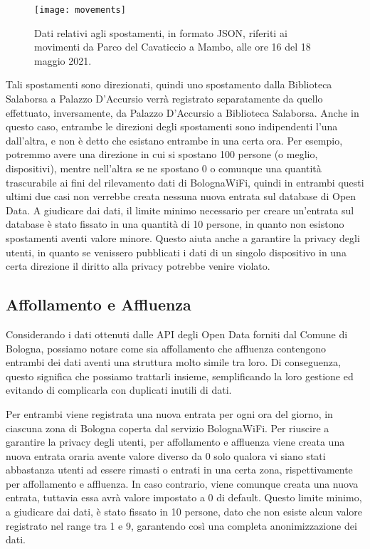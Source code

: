 \begin{figure}[H]
    \centering
    \texttt{[image: movements]}
    \caption[Struttura dei dati sugli spostamenti]{Dati relativi agli spostamenti, in formato JSON, riferiti ai movimenti da Parco del Cavaticcio a Mambo, alle ore 16 del 18 maggio 2021.}
    \label{fig:movements}
\end{figure}

Tali spostamenti sono direzionati, quindi uno spostamento dalla Biblioteca Salaborsa a Palazzo D'Accursio verrà registrato separatamente da quello effettuato, inversamente, da Palazzo D'Accursio a Biblioteca Salaborsa. Anche in questo caso, entrambe le direzioni degli spostamenti sono indipendenti l'una dall'altra, e non è detto che esistano entrambe in una certa ora. Per esempio, potremmo avere una direzione in cui si spostano 100 persone (o meglio, dispositivi), mentre nell'altra se ne spostano 0 o comunque una quantità trascurabile ai fini del rilevamento dati di BolognaWiFi, quindi in entrambi questi ultimi due casi non verrebbe creata nessuna nuova entrata sul database di Open Data. A giudicare dai dati, il limite minimo necessario per creare un'entrata sul database è stato fissato in una quantità di 10 persone, in quanto non esistono spostamenti aventi valore minore. Questo aiuta anche a garantire la privacy degli utenti, in quanto se venissero pubblicati i dati di un singolo dispositivo in una certa direzione il diritto alla privacy potrebbe venire violato.

\subsection{Affollamento e Affluenza}
Considerando i dati ottenuti dalle API degli Open Data forniti dal Comune di Bologna, possiamo notare come sia affollamento che affluenza contengono entrambi dei dati aventi una struttura molto simile tra loro. Di conseguenza, questo significa che possiamo trattarli insieme, semplificando la loro gestione ed evitando di complicarla con duplicati inutili di dati.

Per entrambi viene registrata una nuova entrata per ogni ora del giorno, in ciascuna zona di Bologna coperta dal servizio BolognaWiFi. Per riuscire a garantire la privacy degli utenti, per affollamento e affluenza viene creata una nuova entrata oraria avente valore diverso da 0 solo qualora vi siano stati abbastanza utenti ad essere rimasti o entrati in una certa zona, rispettivamente per affollamento e affluenza. In caso contrario, viene comunque creata una nuova entrata, tuttavia essa avrà valore impostato a 0 di default. Questo limite minimo, a giudicare dai dati, è stato fissato in 10 persone, dato che non esiste alcun valore registrato nel range tra 1 e 9, garantendo così una completa anonimizzazione dei dati.


